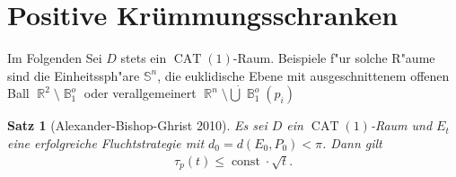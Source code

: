\documentclass[paper=A4, twoside, chapterprefix=true, bibliography=totoc, headsepline]{scrbook}
\DeclareMathOperator{\B}{\mathbb{B}} %
\DeclareMathOperator{\R}{\mathbb{R}}
\renewcommand{\S}{\mathbb{S}}
\DeclareMathOperator{\const}{const} %
\DeclareMathOperator{\CAT}{CAT}
\theoremstyle{break}
\theoremstyle{nonumberbreak}
\newtheorem{satz}{Satz}
\theoremstyle{emptybreak}
\theoremstyle{break}
\begin{document}
\section{Positive Kr\"ummungsschranken}

Im Folgenden Sei $D$ stets ein $\CAT(1)$-Raum.
Beispiele f"ur solche R"aume sind die Einheitssph"are $\S^n$, die euklidische Ebene mit ausgeschnittenem offenen Ball $\R^2 \setminus \B_1^o$ oder verallgemeinert $\R^n \setminus \dot\bigcup \B_1^o(p_i)$

\begin{satz}[Alexander-Bishop-Ghrist 2010]
Es sei $D$ ein $\CAT(1)$-Raum und $E_t$ eine erfolgreiche Fluchtstrategie mit $d_0 = d(E_0, P_0) < \pi$.
Dann gilt
\begin{align*}
	\tau_p(t) \le \const \cdot \sqrt{t}.
\end{align*}
\end{satz}
\end{document}
